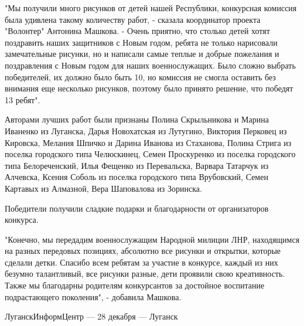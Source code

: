 "Мы получили много рисунков от детей нашей Республики, конкурсная комиссия
была удивлена такому количеству работ, - сказала координатор проекта
"Волонтер" Антонина Машкова. - Очень приятно, что столько детей хотят
поздравить наших защитников с Новым годом, ребята не только нарисовали
замечательные рисунки, но и написали самые теплые и добрые пожелания и
поздравления с Новым годом для наших военнослужащих. Было сложно выбрать
победителей, их должно было быть 10, но комиссия не смогла оставить без
внимания еще несколько рисунков, поэтому было принято решение, что победят
13 ребят".

Авторами лучших работ были признаны Полина Скрыльникова и Марина Иваненко
из Луганска, Дарья Новохатская из Лутугино, Виктория Перковец из Кировска,
Мелания Шпичко и Дарина Иванова из Стаханова, Полина Стрига из поселка
городского типа Челюскинец, Семен Проскуренко из поселка городского типа
Белореченский, Илья Фещенко из Перевальска, Варвара Татарчук из Алчевска,
Ксения Соболь из поселка городского типа Врубовский, Семен Картавых из
Алмазной, Вера Шаповалова из Зоринска.

Победители получили сладкие подарки и благодарности от организаторов
конкурса.

"Конечно, мы передадим военнослужащим Народной милиции ЛНР, находящимся на
разных передовых позициях, абсолютно все рисунки и открытки, которые
сделали детки. Спасибо всем ребятам за участие в конкурсе, каждый из них
безумно талантливый, все рисунки разные, дети проявили свою креативность.
Также мы благодарны родителям конкурсантов за достойное воспитание
подрастающего поколения", - добавила Машкова.

ЛуганскИнформЦентр — 28 декабря — Луганск
